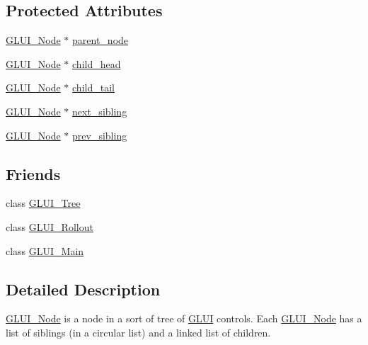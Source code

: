\subsection*{Protected Attributes}
\begin{DoxyCompactItemize}
\item 
\hyperlink{class_g_l_u_i___node}{G\+L\+U\+I\+\_\+\+Node} $\ast$ \hyperlink{class_g_l_u_i___node_a308f39e8a182f499139381840418a573}{parent\+\_\+node}
\item 
\hyperlink{class_g_l_u_i___node}{G\+L\+U\+I\+\_\+\+Node} $\ast$ \hyperlink{class_g_l_u_i___node_ad9370e7f62e83bb720063d2439f544c2}{child\+\_\+head}
\item 
\hyperlink{class_g_l_u_i___node}{G\+L\+U\+I\+\_\+\+Node} $\ast$ \hyperlink{class_g_l_u_i___node_a971d8e606c1a3442ad9b8681bdb9ed59}{child\+\_\+tail}
\item 
\hyperlink{class_g_l_u_i___node}{G\+L\+U\+I\+\_\+\+Node} $\ast$ \hyperlink{class_g_l_u_i___node_a2c99ef6a1290035f98871d859d05e890}{next\+\_\+sibling}
\item 
\hyperlink{class_g_l_u_i___node}{G\+L\+U\+I\+\_\+\+Node} $\ast$ \hyperlink{class_g_l_u_i___node_afa72f0491ca54ce8d0a0af7049de8049}{prev\+\_\+sibling}
\end{DoxyCompactItemize}
\subsection*{Friends}
\begin{DoxyCompactItemize}
\item 
class \hyperlink{class_g_l_u_i___node_a5cd4411266c4ef47da626d8efdf1138e}{G\+L\+U\+I\+\_\+\+Tree}
\item 
class \hyperlink{class_g_l_u_i___node_a342e7f489f8666a8156fb18bd0ea0d2e}{G\+L\+U\+I\+\_\+\+Rollout}
\item 
class \hyperlink{class_g_l_u_i___node_a97e15a1bec3e5f03f25594cb1d690fee}{G\+L\+U\+I\+\_\+\+Main}
\end{DoxyCompactItemize}


\subsection{Detailed Description}
\hyperlink{class_g_l_u_i___node}{G\+L\+U\+I\+\_\+\+Node} is a node in a sort of tree of \hyperlink{class_g_l_u_i}{G\+L\+U\+I} controls. Each \hyperlink{class_g_l_u_i___node}{G\+L\+U\+I\+\_\+\+Node} has a list of siblings (in a circular list) and a linked list of children.

